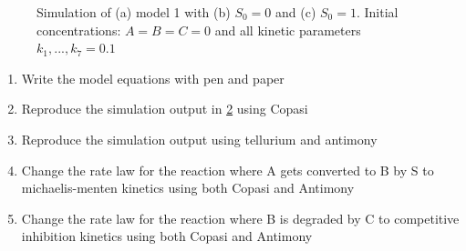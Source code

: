 \documentclass[11pt]{article}
\begin{document}
\begin{figure}[h]
\begin{subfigure}{0.45\textwidth}
            \caption{}
            \label{b}
        \end{subfigure}
        \caption{Simulation of (a) model 1 with (b) $S_{0}=0$ and (c) $S_0=1$. Initial concentrations: $A=B=C=0$ and
        all kinetic parameters $k_1, ..., k_7 = 0.1$}
        \label{fig:model1}
    \end{figure}

    \begin{enumerate}
        \item Write the model equations with pen and paper
        \item Reproduce the simulation output in \cref{fig:model1} using Copasi
        \item Reproduce the simulation output using tellurium and antimony
        \item Change the rate law for the reaction where A gets converted to B by S to michaelis-menten kinetics using both Copasi and Antimony
        \item Change the rate law for the reaction where B is degraded by C to competitive inhibition kinetics using both Copasi and Antimony
    \end{enumerate}

\end{document}
